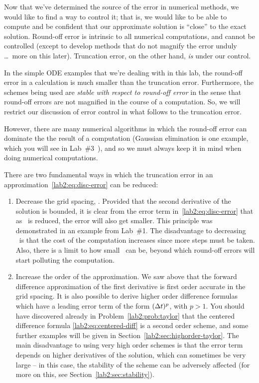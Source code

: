 Now that we've determined the source of the error in numerical
methods, we would like to find a way to control it; that is, we would
like to be able to compute and be confident that our approximate solution is
``close'' to the exact solution.
Round-off error is intrinsic to all numerical computations, and cannot
be controlled (except to develop methods that do not magnify the error
unduly \dots\ more on this later).  
Truncation error, on the other
hand, \emph{ is} under our control.
\begin{note}
  In the simple ODE examples that we're dealing with in this lab, the
  round-off error in a calculation is much smaller than 
  the truncation error.  Furthermore, the schemes being used are \emph{
    stable with respect to round-off error} in the sense that
  round-off errors are not magnified in the course of a computation.
  So, we will restrict our discussion of error control in what follows
  to the truncation error.

  However, there are many numerical algorithms in which the  round-off
  error can dominate the the result of a computation (Gaussian
  elimination is one example, which you will see in
  Lab~\#3~), and so we must
  always keep it in mind when doing numerical computations. 
\end{note}

There are two fundamental ways in which the truncation error in an
approximation~\eqref{lab2:eq:disc-error} can be reduced: 
\begin{enumerate}
\item Decrease the grid spacing, \dt.  
  Provided that the second derivative of the solution is bounded, it
  is clear from the error term in~\eqref{lab2:eq:disc-error} that as \dt\ 
  is reduced, the error will also get smaller.  This principle was
  demonstrated in an example from
  Lab~\#1. 
  The disadvantage to decreasing \dt\ is that the cost of the
  computation increases since more steps must be taken.
  Also, there is a limit to how small \dt\ can be, 
  beyond which round-off errors will start
  polluting the computation.
\item Increase the order of the approximation.
  We saw above that the forward difference
  approximation of the first derivative is first order accurate in the
  grid spacing.  It is also possible to derive higher order difference
  formulas which have a leading error term of the form $(\mbox{$\Delta t$}{})^p$,
  with $p>1$. 
  You should have discovered already in Problem~\ref{lab2:prob:taylor}
  that the centered difference formula
  \eqref{lab2:eq:centered-diff} is a second order scheme, and some
  further examples will be given in 
  Section~\ref{lab2:sec:highorder-taylor}.
  The main disadvantage to using very high order schemes is that the
  error term depends on higher derivatives of the solution, which can
  sometimes be very large -- in this case, the stability of the scheme
  can be adversely affected (for more on this, see
  Section~\ref{lab2:sec:stability}). 
\end{enumerate}


